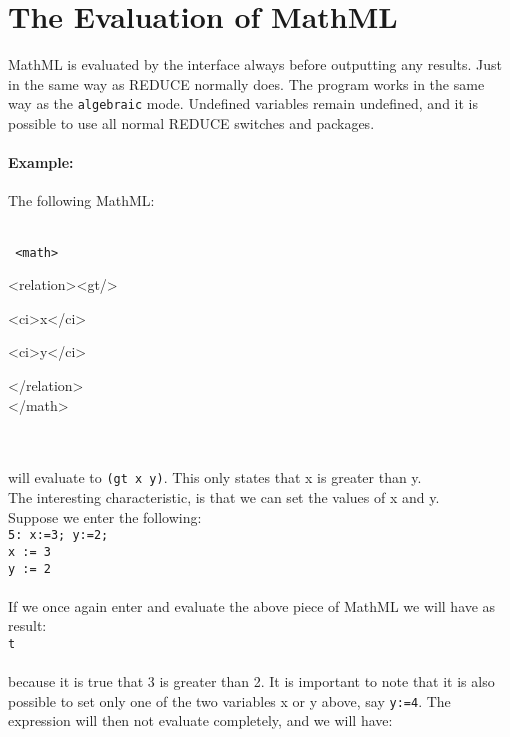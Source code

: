 \documentclass{article}
\begin{document}
\section{The Evaluation of MathML}


MathML is evaluated by the interface always before outputting any results.
Just in the same way as REDUCE normally does. The program works in the same
way as the {\tt algebraic} mode. Undefined variables remain undefined,
and it is possible to use all normal REDUCE switches and packages.

\paragraph{Example:}

\noindent The following MathML:\\
\\
{\tt 
\hspace*{0mm}<math>

\hspace*{1mm}<relation><gt/>

\hspace*{6mm}<ci>x</ci>

\hspace*{6mm}<ci>y</ci>

\hspace*{1mm}</relation>
\\
\hspace*{0mm}</math>}
\\
\\
will evaluate to {\tt (gt x y)}. This only states that x is greater than y.
\\
The interesting characteristic, is that we can set the values of x and y.
\\
Suppose we enter the following:
\\

{\tt 5: x:=3; y:=2;
\\

x := 3
\\

y := 2}
\\
\\
If we once again enter and evaluate the above piece of MathML we will have as
result:
\\

{\tt t}
\\
\\
because it is true that 3 is greater than 2. It is important to note that
it is also possible to set only one of the two variables x or y above, say
{\tt y:=4}. The expression will then not evaluate completely, and we will
have:  \\
\end{document}
